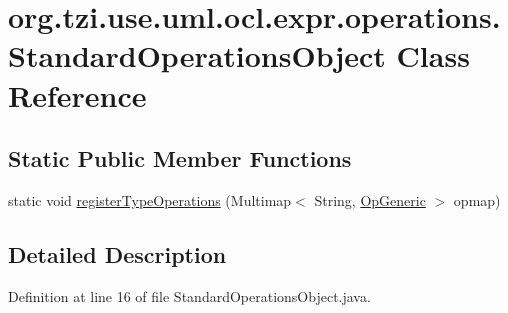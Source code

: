\hypertarget{classorg_1_1tzi_1_1use_1_1uml_1_1ocl_1_1expr_1_1operations_1_1_standard_operations_object}{\section{org.\-tzi.\-use.\-uml.\-ocl.\-expr.\-operations.\-Standard\-Operations\-Object Class Reference}
\label{classorg_1_1tzi_1_1use_1_1uml_1_1ocl_1_1expr_1_1operations_1_1_standard_operations_object}
}
\subsection*{Static Public Member Functions}
\begin{DoxyCompactItemize}
\item 
static void \hyperlink{classorg_1_1tzi_1_1use_1_1uml_1_1ocl_1_1expr_1_1operations_1_1_standard_operations_object_a33e95c8172d585c00f6317c91be24d8a}{register\-Type\-Operations} (Multimap$<$ String, \hyperlink{classorg_1_1tzi_1_1use_1_1uml_1_1ocl_1_1expr_1_1operations_1_1_op_generic}{Op\-Generic} $>$ opmap)
\end{DoxyCompactItemize}


\subsection{Detailed Description}


Definition at line 16 of file Standard\-Operations\-Object.\-java.



